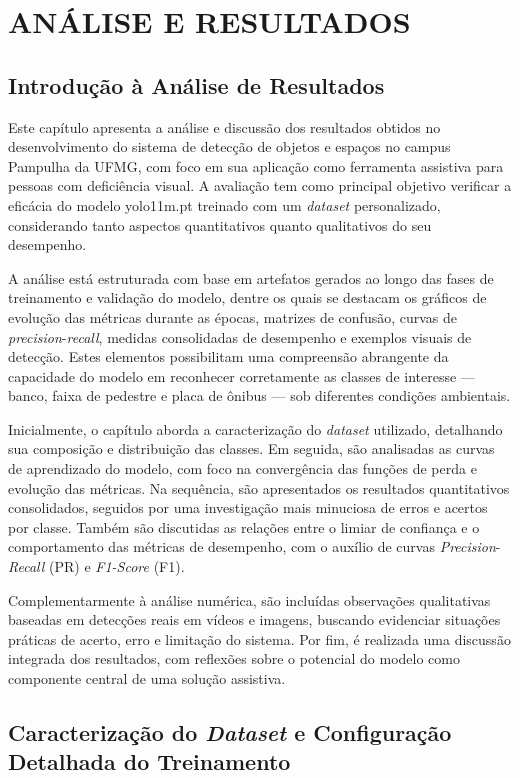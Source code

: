 \chapter{\textbf{ANÁLISE E RESULTADOS}}
\section{Introdução à Análise de Resultados}

Este capítulo apresenta a análise e discussão dos resultados obtidos no desenvolvimento do sistema de detecção de objetos e espaços no campus Pampulha da UFMG, com foco em sua aplicação como ferramenta assistiva para pessoas com deficiência visual. A avaliação tem como principal objetivo verificar a eficácia do modelo yolo11m.pt treinado com um \textit{dataset} personalizado, considerando tanto aspectos quantitativos quanto qualitativos do seu desempenho.

A análise está estruturada com base em artefatos gerados ao longo das fases de treinamento e validação do modelo, dentre os quais se destacam os gráficos de evolução das métricas durante as épocas, matrizes de confusão, curvas de \textit{precision}-\textit{recall}, medidas consolidadas de desempenho e exemplos visuais de detecção. Estes elementos possibilitam uma compreensão abrangente da capacidade do modelo em reconhecer corretamente as classes de interesse — banco, faixa de pedestre e placa de ônibus — sob diferentes condições ambientais.

Inicialmente, o capítulo aborda a caracterização do \textit{dataset} utilizado, detalhando sua composição e distribuição das classes. Em seguida, são analisadas as curvas de aprendizado do modelo, com foco na convergência das funções de perda e evolução das métricas. Na sequência, são apresentados os resultados quantitativos consolidados, seguidos por uma investigação mais minuciosa de erros e acertos por classe. Também são discutidas as relações entre o limiar de confiança e o comportamento das métricas de desempenho, com o auxílio de curvas \textit{Precision}-\textit{Recall} (PR) e \textit{F1-Score} (F1).

Complementarmente à análise numérica, são incluídas observações qualitativas baseadas em detecções reais em vídeos e imagens, buscando evidenciar situações práticas de acerto, erro e limitação do sistema. Por fim, é realizada uma discussão integrada dos resultados, com reflexões sobre o potencial do modelo como componente central de uma solução assistiva.

\section{Caracterização do \textit{Dataset} e Configuração Detalhada do Treinamento}

